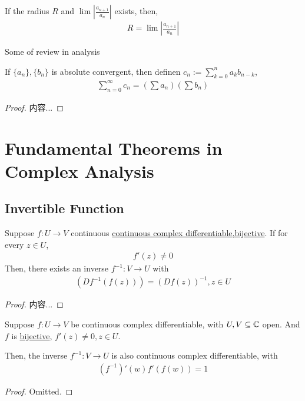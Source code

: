 \documentclass[Total.tex]{subfiles}
\begin{document}
			\begin{corollary}
				If the radius $R$ and $\lim |\frac{a_{n+1}}{a_n}|$ exists, then,
				\begin{gather*}
					R=\lim |\frac{a_{n+1}}{a_n}|
				\end{gather*}
			\end{corollary}
			Some of review in analysis
			\begin{proposition}
				If $\{a_n\},\{b_n\}$ is absolute convergent, then definen $c_n:=\sum_{k=0}^n a_k b_{n-k}$,
				\begin{gather*}
					\sum_{n=0}^\infty c_n=(\sum a_n)(\sum b_n)
				\end{gather*}
			\end{proposition}
			\begin{proof}
				内容...
			\end{proof}
			
		\section{Fundamental Theorems in Complex Analysis}
			\subsection{Invertible Function}
				\begin{proposition}
					Suppose $f:U\rightarrow V$ continuous \underline{continuous complex differentiable,bijective}. If for every $z\in U$,
					\begin{gather*}
						f'(z)\not=0
					\end{gather*}
					Then, there exists an inverse $f^{-1}:V\rightarrow U$ with 
					\begin{gather*}
						(Df^{-1}(f(z)))=(Df(z))^{-1},z\in U
					\end{gather*}
				\end{proposition}
				\begin{proof}
					内容...
				\end{proof}
				
				\begin{proposition}
					Suppose $f:U\rightarrow V$ be continuous complex differentiable, with $U,V\subseteq \mathbb{C}$ open. And $f$ is \underline{bijective}, $f'(z)\not=0,z\in U$.
					
					Then, the inverse $f^{-1}:V\rightarrow U$ is also continuous complex differentiable, with
					\begin{gather*}
						(f^{-1})'(w)f'(f(w))=1
					\end{gather*}
				\end{proposition}
				\begin{proof}
					Omitted.
				\end{proof}
\end{document}
